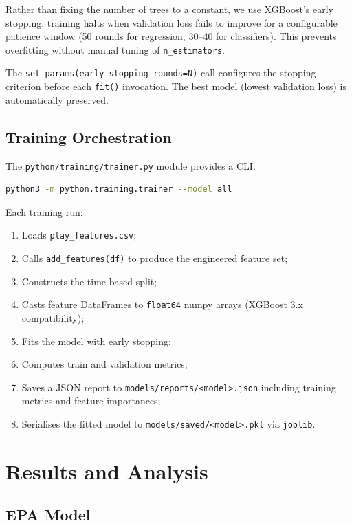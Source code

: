 \documentclass[11pt]{article}
\begin{document}
Rather than fixing the number of trees to a constant, we use XGBoost's
early stopping: training halts when validation loss fails to improve for
a configurable patience window (50 rounds for regression, 30--40 for
classifiers). This prevents overfitting without manual tuning of
\texttt{n\_estimators}.

The \texttt{set\_params(early\_stopping\_rounds=N)} call configures the stopping
criterion before each \texttt{fit()} invocation. The best model (lowest
validation loss) is automatically preserved.

\subsection{Training Orchestration}

The \texttt{python/training/trainer.py} module provides a CLI:
\begin{lstlisting}[language=bash]
python3 -m python.training.trainer --model all
\end{lstlisting}
Each training run:
\begin{enumerate}[noitemsep]
  \item Loads \texttt{play\_features.csv};
  \item Calls \texttt{add\_features(df)} to produce the engineered feature set;
  \item Constructs the time-based split;
  \item Casts feature DataFrames to \texttt{float64} numpy arrays (XGBoost 3.x compatibility);
  \item Fits the model with early stopping;
  \item Computes train and validation metrics;
  \item Saves a JSON report to \texttt{models/reports/<model>.json} including
    training metrics and feature importances;
  \item Serialises the fitted model to \texttt{models/saved/<model>.pkl} via
    \texttt{joblib}.
\end{enumerate}

\section{Results and Analysis}
\label{sec:results}

\subsection{EPA Model}
\end{document}
